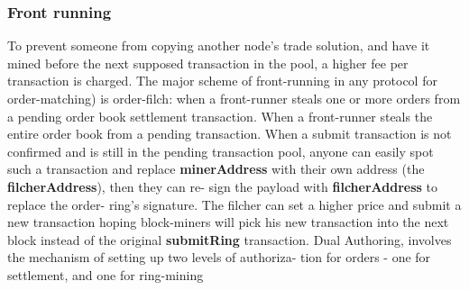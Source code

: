 \documentclass[]{article}
\begin{document}
		\subsubsection{Front running}
		To prevent someone from copying another node's trade solution, 
		and have it mined before the next supposed transaction in the pool, 
		a higher fee per transaction is charged. 
		The major scheme of front-running in  any protocol for
		order-matching) is order-filch: when a front-runner steals
		one or more orders from a pending order book settlement
		transaction. When a front-runner
		steals the entire order book from a pending transaction.
		When a submit transaction is not confirmed and
		is still in the pending transaction pool, anyone can easily
		spot such a transaction and replace \textbf{minerAddress} with
		their own address (the \textbf{filcherAddress}), then they can re-
		sign the payload with \textbf{filcherAddress} to replace the order-
		ring's signature. The filcher can set a higher price and
		submit a new transaction hoping block-miners will pick his
		new transaction into the next block instead of the original
		\textbf{submitRing} transaction.
		Dual Authoring, involves the mechanism of setting up two levels of authoriza-
		tion for orders - one for settlement, and one for ring-mining
\end{document}
